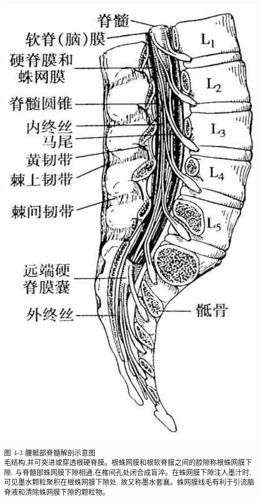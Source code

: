 \documentclass[10pt]{article}
\begin{document}
\begin{center}
\includegraphics[max width=\textwidth]{2024_07_09_002a177993bd97d1d6d7g-059(1)}
\end{center}

图 4-3 腰骶部脊髓解剖示意图\\
毛结构,并可突进或穿透根硬脊膜。根蛛网膜和根软脊膜之间的腔隙称根蛛网膜下隙, 与脊髓部蛛网膜下隙相通,在椎间孔处闭合成盲淬。在蛛网膜下隙注人墨汁时,可见墨水颗粒聚积在根蛛网膜下隙处, 故又称墨水套襄。蛛网膜线毛有利于引流脑脊液和清除蛛网膜下隙的颗粒物。
\end{document}
